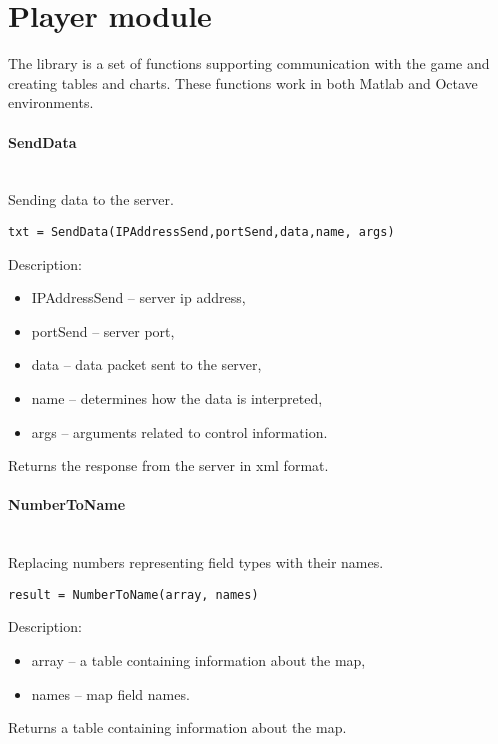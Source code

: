 \section{Player module}

The library is a set of functions supporting communication with the game and creating tables and charts. These functions work in both Matlab and Octave environments.

\paragraph{SendData} \hspace{0pt} \\
Sending data to the server.

\begin{lstlisting}[style=Matlab-editor]
txt = SendData(IPAddressSend,portSend,data,name, args)
\end{lstlisting}

Description:
\begin{itemize}
\item  IPAddressSend -- server ip address,
\item  portSend -- server port,
\item  data -- data packet sent to the server,
\item  name  -- determines how the data is interpreted,
\item  args  -- arguments related to control information.
\end{itemize}

Returns the response from the server in xml format.

\paragraph{NumberToName} \hspace{0pt} \\
Replacing numbers representing field types with their names.
\begin{lstlisting}[style=Matlab-editor]
result = NumberToName(array, names)
\end{lstlisting}

Description:
\begin{itemize}
\item  array -- a table containing information about the map,
\item  names -- map field names.
\end{itemize}

Returns a table containing information about the map.

